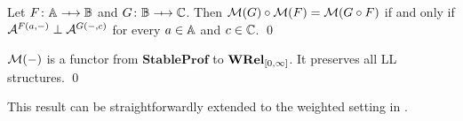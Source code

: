 \begin{theorem}
    Let \( F \colon \Grp \profarrow \Grpb \) and \( G \colon \Grpb \profarrow \Grpc \).
    Then \( \mathcal{M}({G}) \circ \mathcal{M}({F}) = \mathcal{M}({G \circ F}) \) if and only if \( \mathcal{A}^{F(a, {-})} \mathrel{\bot} \mathcal{A}^{G({-}, c)} \) for every \( a \in \mathbb{A} \) and \( c \in \mathbb{C} \).
    \qed
\end{theorem}

\newcommand{\StableProf}{\mathbf{StableProf}}
\begin{corollary}
    \( \mathcal{M}({{-}}) \) is a functor from \( \StableProf \) to \( \mathbf{WRel}_{[0,\infty]} \).
    It preserves all LL structures.
    \qed
\end{corollary}

This result can be straightforwardly extended to the weighted setting in \cite{Tsukada2018}.

